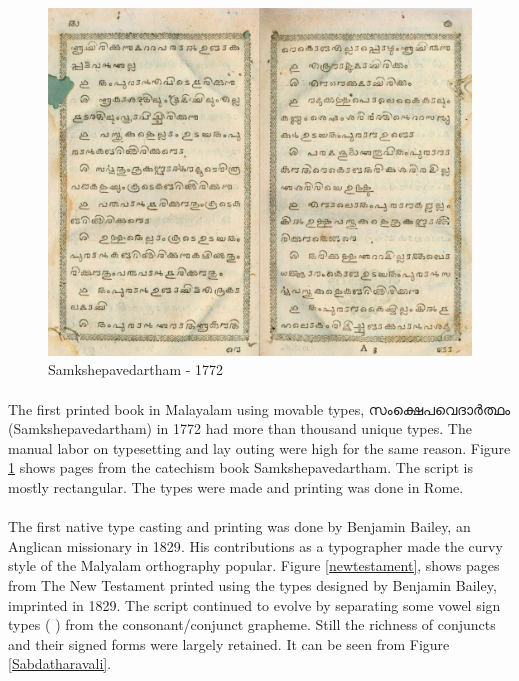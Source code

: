 \documentclass[10pt]{article}
\begin{document}
\begin{figure}[h!]
	\centering
	\includegraphics[width=\textwidth]{images/samkshepavedartham1772.png}
	\caption{Samkshepavedartham - 1772}
	\label{Samkshepam}
\end{figure} 


\paragraph{}
The first printed book in Malayalam using movable types, {\manjari സംക്ഷെപവെദാർത്ഥം} (Samkshepavedartham) in 1772 had more than thousand unique types\cite{babucherian}. The manual labor on typesetting and lay outing were high for the same reason. Figure \ref{Samkshepam} shows pages from the catechism book Samkshepavedartham. The script is mostly rectangular. The types were made and printing was done in Rome. 

\paragraph{}
The first native type casting and printing was done by Benjamin Bailey, an Anglican missionary in 1829\cite{babucherian}.  His contributions as a typographer made the curvy style of the Malyalam orthography popular\cite{gupthannair}. Figure \ref{newtestament}, shows pages from The New Testament printed using the types designed by Benjamin Bailey, imprinted in 1829\cite{babucherian}. The script continued to evolve by separating some vowel sign types ({ }) from the consonant/conjunct grapheme. Still the richness of conjuncts and their signed forms were largely retained. It can be seen from Figure \ref{Sabdatharavali}. 
\end{document}
